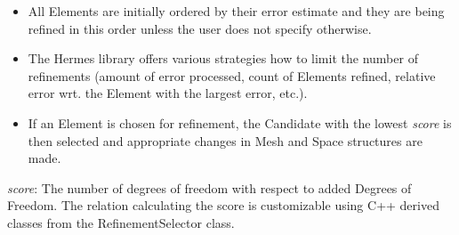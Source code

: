 \documentclass{beamer}
\begin{document}
\begin{frame}
\begin{center}
\begin{figure}[t]
\end{figure}
\end{center}
\begin{itemize}
\item
All Elements are initially ordered by their error estimate and they are being refined in this order unless the user does not specify otherwise.
\item
The Hermes library offers various strategies how to limit the number of refinements (amount of error processed, count of Elements refined, relative error wrt. the Element with the largest error, etc.).
\item
If an Element is chosen for refinement, the Candidate with the lowest \emph{score} is then selected and appropriate changes in Mesh and Space structures are made.
\end{itemize}
\scriptsize
\emph{score}: The number of degrees of freedom with respect to added Degrees of Freedom. The relation calculating the score is customizable using C++ derived classes from the RefinementSelector class.
\end{frame}
\end{document}
